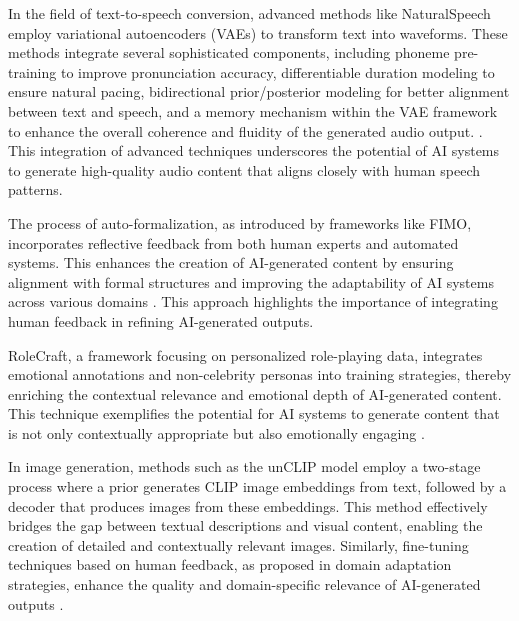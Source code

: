 In the field of text-to-speech conversion, advanced methods like NaturalSpeech employ variational autoencoders (VAEs) to transform text into waveforms. These methods integrate several sophisticated components, including phoneme pre-training to improve pronunciation accuracy, differentiable duration modeling to ensure natural pacing, bidirectional prior/posterior modeling for better alignment between text and speech, and a memory mechanism within the VAE framework to enhance the overall coherence and fluidity of the generated audio output. \cite{tan2022naturalspeechendtoendtextspeech}. This integration of advanced techniques underscores the potential of AI systems to generate high-quality audio content that aligns closely with human speech patterns.



The process of auto-formalization, as introduced by frameworks like FIMO, incorporates reflective feedback from both human experts and automated systems. This enhances the creation of AI-generated content by ensuring alignment with formal structures and improving the adaptability of AI systems across various domains \cite{thapliyal2022crossmodal3600massivelymultilingualmultimodal}. This approach highlights the importance of integrating human feedback in refining AI-generated outputs.



RoleCraft, a framework focusing on personalized role-playing data, integrates emotional annotations and non-celebrity personas into training strategies, thereby enriching the contextual relevance and emotional depth of AI-generated content. This technique exemplifies the potential for AI systems to generate content that is not only contextually appropriate but also emotionally engaging \cite{bogoychev2020domaintranslationesenoisesynthetic}.



In image generation, methods such as the unCLIP model employ a two-stage process where a prior generates CLIP image embeddings from text, followed by a decoder that produces images from these embeddings. This method effectively bridges the gap between textual descriptions and visual content, enabling the creation of detailed and contextually relevant images. Similarly, fine-tuning techniques based on human feedback, as proposed in domain adaptation strategies, enhance the quality and domain-specific relevance of AI-generated outputs \cite{pandy2024advancementsroboticsprocessautomation}.



